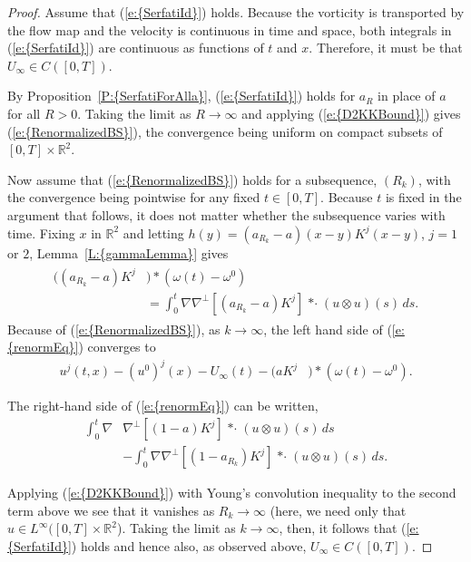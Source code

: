 \documentclass[reqno,openright,11pt,twoside]{amsart}
\theoremstyle{definition}
\numberwithin{equation}{section}
\begin{document}
\begin{proof}
	Assume that {(\ref{e:{SerfatiId}})} holds.
	Because the vorticity
	is transported by the flow map and the velocity is continuous in time and space,
	both integrals in {(\ref{e:{SerfatiId}})} are continuous as functions of $t$ and $x$. Therefore,
	it must be that $U_{\ensuremath{\infty}} \in C([0, T])$.
	
	By {Proposition~\ref{P:{SerfatiForAlla}}}, {(\ref{e:{SerfatiId}})} holds for $a_R$ in place
	of $a$ for all $R > 0$. Taking the limit as $R \to {\ensuremath{\infty}}$ and 
	applying {(\ref{e:{D2KKBound}})} gives {(\ref{e:{RenormalizedBS}})},
	the convergence being uniform on compact subsets
	of $[0, T] \times {\ensuremath{{\ensuremath{\mathbb{{R}}}}}}^2$.
	
	Now assume that {(\ref{e:{RenormalizedBS}})} holds for a subsequence,
	$(R_k)$, with
	the convergence being pointwise for any fixed $t \in [0, T]$.
	Because $t$ is fixed in the argument that follows, it does not matter
	whether the subsequence varies with time.
	Fixing $x$ in ${\ensuremath{{\ensuremath{\mathbb{{R}}}}}}^2$ and letting
	$h(y) = (a_{R_k} - a)(x - y) K^j(x - y)$, $j = 1$ or $2$,
	{Lemma~\ref{L:{gammaLemma}}} gives
	\begin{align}\label{e:renormEq}
		\begin{split}
			((a_{R_k} - a) K^j&) * (\omega(t) - \omega^0) \\
				&= \int_0^t {\ensuremath{\nabla}} {\ensuremath{\nabla}}^\perp {\ensuremath{\left[ {(a_{R_k} - a) K^j} \right]}} {\mathop{* \cdot}}
					(u \otimes u)(s) \, ds.
		\end{split}
	\end{align}
	Because of {(\ref{e:{RenormalizedBS}})}, as $k \to {\ensuremath{\infty}}$,
	the left hand side of {(\ref{e:{renormEq}})} converges to
	\begin{align*}
		u^j(t, x) - (u^0)^j(x) - U_{\ensuremath{\infty}}(t)
			- (a K^j&) * (\omega(t) - \omega^0).
	\end{align*}
	
	The right-hand side of {(\ref{e:{renormEq}})} can be written,
	\begin{align*}
		\int_0^t {\ensuremath{\nabla}} &{\ensuremath{\nabla}}^\perp {\ensuremath{\left[ {(1 - a) K^j} \right]}} {\mathop{* \cdot}}
					(u \otimes u)(s) \, ds \\
			&-
		\int_0^t {\ensuremath{\nabla}} {\ensuremath{\nabla}}^\perp {\ensuremath{\left[ {(1 - a_{R_k}) K^j} \right]}} {\mathop{* \cdot}}
					(u \otimes u)(s) \, ds.
	\end{align*}
	
	
	
	Applying {(\ref{e:{D2KKBound}})} with Young's convolution inequality
	to the second term above we see that it vanishes as $R_{k} \to {\ensuremath{\infty}}$
	(here, we need only that $u \in L^{\ensuremath{\infty}}([0, T] \times {\ensuremath{{\ensuremath{\mathbb{{R}}}}}}^2$).
	Taking the limit as $k \to {\ensuremath{\infty}}$, then, it follows that {(\ref{e:{SerfatiId}})} holds and hence also,
	as observed above, $U_{\ensuremath{\infty}} \in C([0, T])$.
\end{proof}
\end{document}
